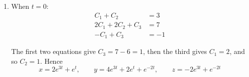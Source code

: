 \documentclass[leqno]{article}
\begin{document}
\begin{enumerate}[
  label=\textbf{\arabic*.},
  leftmargin=*,
  topsep=0pt,
  partopsep=0pt,
  parsep=0pt
]
\begin{djsSolution}
\begin{enumerate}[label=\textbf{(\alph*)}, start=1]
\begin{enumerate}[label=(\roman*), start=1]
So the equations separate as
\[
\dot{u}=3u,\qquad \dot{v}=v,\qquad \dot{w}=-2w
\]

By part (c)(i), we have
\[
u=C_1e^{3t},\qquad v=C_2e^{t},\qquad w=C_3e^{-2t}
\]

where \(C_1\), \(C_2\), \(C_3\) are arbitrary constants. Therefore
\begin{align*}
\begin{pmatrix}x\\ y\\ z\end{pmatrix}&=\begin{pmatrix}1&1&0\\ 2&2&1\\ -1&0&1\end{pmatrix}\begin{pmatrix}C_1e^{3t}\\ C_2e^{t}\\ C_3e^{-2t}\end{pmatrix}\\
&=C_1e^{3t}\begin{pmatrix}1\\ 2\\ -1\end{pmatrix}+C_2e^{t}\begin{pmatrix}1\\ 2\\ 0\end{pmatrix}+C_3e^{-2t}\begin{pmatrix}0\\ 1\\ 1\end{pmatrix}
\end{align*}

    \item When \(t=0\):
\begin{align*}
C_1+C_2&=3\\
2C_1+2C_2+C_3&=7\\
-C_1+C_3&=-1
\end{align*}

The first two equations give \(C_3=7-6=1\), then the third gives \(C_1=2\), and so \(C_2=1\). Hence
\[
x=2e^{3t}+e^{t},\qquad y=4e^{3t}+2e^{t}+e^{-2t},\qquad z=-2e^{3t}+e^{-2t}
\]

  \end{enumerate}
\end{enumerate}
\end{djsSolution}

\end{enumerate}
\end{document}
